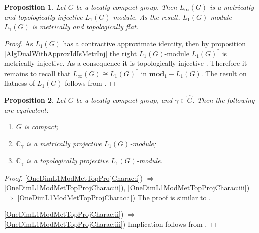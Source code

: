 \documentclass{article}
\theoremstyle{plain}
\newtheorem{proposition}{Proposition}[section]
\theoremstyle{definition}
\newtheorem{proof}{Proof}\def\theproof{}
\newcommand{\isom}{\mathop{\mathbin{\cong}}}
\begin{document}
\begin{fulltext}
\begin{proposition}\label{LInfIsL1MetrInj} Let $G$ be a locally compact group. Then 
$L_\infty(G)$ is a metrically and topologically injective $L_1(G)$-module. As the 
result, $L_1(G)$-module $L_1(G)$ is metrically and topologically flat.
\end{proposition}
\begin{proof} As $L_1(G)$ has a contractive approximate identity, then by 
proposition \ref{AlgDualWithApproxIdIsMetrInj} the right $L_1(G)$-module $L_1(G)^*$ 
is metrically injective. As a consequence it is topologically injective 
\cite[proposition 2.14]{NemGeomProjInjFlatBanMod}. Therefore it remains to recall that 
$L_\infty(G)\isom L_1(G)^*$ in $\mathbf{mod}_1-L_1(G)$. The result on flatness of 
$L_1(G)$ follows from  \cite[proposition 2.21]{NemGeomProjInjFlatBanMod}.
\end{proof}

\begin{proposition}\label{OneDimL1ModMetTopProjCharac} Let $G$ be a locally compact 
group, and $\gamma\in\widehat{G}$. Then the following are equivalent:
\begin{enumerate}
    \item $G$ is compact; 
    \label{OneDimL1ModMetTopProjCharac:i}
    \item $\mathbb{C}_\gamma$ is a metrically projective $L_1(G)$-module;
    \label{OneDimL1ModMetTopProjCharac:ii}
    \item $\mathbb{C}_\gamma$ is a topologically projective $L_1(G)$-module.
    \label{OneDimL1ModMetTopProjCharac:iii}
\end{enumerate}
\end{proposition}
\begin{proof} \ref{OneDimL1ModMetTopProjCharac:i}) $\Longrightarrow$ \ref{OneDimL1ModMetTopProjCharac:ii}), \ref{OneDimL1ModMetTopProjCharac:iii}) $\Longrightarrow$ \ref{OneDimL1ModMetTopProjCharac:i}) The proof is similar to \cite[theorem 4.2]{GravInjProjBanMod}. 

\ref{OneDimL1ModMetTopProjCharac:ii}) $\Longrightarrow$ \ref{OneDimL1ModMetTopProjCharac:iii}) 
Implication follows from \cite[proposition 2.4]{NemGeomProjInjFlatBanMod}.
\end{proof}


\end{fulltext}
\end{document}
